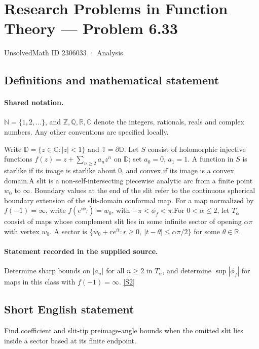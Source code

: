 \documentclass[11pt]{article}
\newcommand{\sref}[2]{\hyperlink{source:#1:#2}{[S#2]}}
\begin{document}
\setcounter{section}{2306032}
\section{Research Problems in Function Theory — Problem 6.33}\label{2306033}
{\small\sffamily UnsolvedMath ID 2306033 · Analysis}
\subsection{Definitions and mathematical statement}

\paragraph{Shared notation.}$\mathbb N=\{1,2,\ldots\}$, and $\mathbb Z,\mathbb Q,\mathbb R,\mathbb C$ denote the integers, rationals, reals and complex numbers. Any other conventions are specified locally.


Write $\mathbb D=\{z\in\mathbb C:|z|<1\}$ and $\mathbb T=\partial\mathbb D$. Let $S$ consist of holomorphic injective functions $f(z)=z+\sum_{n\ge2}a_nz^n$ on $\mathbb D$; set $a_0=0$, $a_1=1$. A function in $S$ is starlike if its image is starlike about $0$, and convex if its image is a convex domain.A slit is a non-self-intersecting piecewise analytic arc from a finite point $w_0$ to $\infty$. Boundary values at the end of the slit refer to the continuous spherical boundary extension of the slit-domain conformal map. For a map normalized by $f(-1)=\infty$, write $f(e^{i\phi_f})=w_0$, with $-\pi<\phi_f<\pi$.For $0<\alpha\le2$, let $T_\alpha$ consist of maps whose complement slit lies in some infinite sector of opening $\alpha\pi$ with vertex $w_0$. A sector is $\{w_0+re^{it}:r\ge0,\ |t-\theta|\le\alpha\pi/2\}$ for some $\theta\in\mathbb R$.
\paragraph{Statement recorded in the supplied source.}
Determine sharp bounds on $|a_n|$ for all $n\ge2$ in $T_\alpha$, and determine $\sup|\phi_f|$ for maps in this class with $f(-1)=\infty$. \sref{2306033}{2}
\subsection{Short English statement}
Find coefficient and slit-tip preimage-angle bounds when the omitted slit lies inside a sector based at its finite endpoint.
\end{document}
